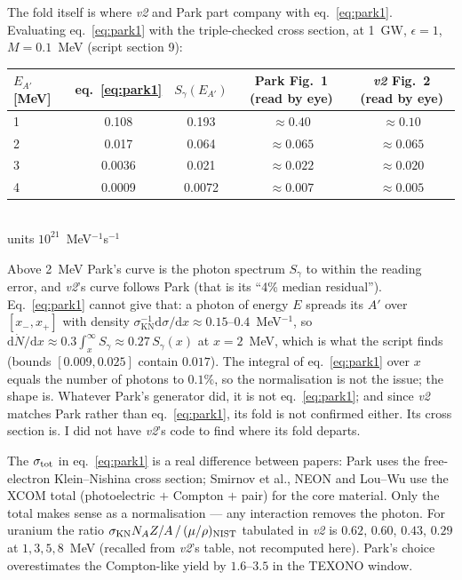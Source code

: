 \documentclass[11pt,a4paper]{article}
\newcommand{\Ap}{A'}
\newcommand{\eps}{\epsilon}
\newcommand{\KN}{\mathrm{KN}}
\newcommand{\dd}{\mathrm{d}}
\begin{document}
The fold itself is where \emph{v2} and Park part company with eq.~\eqref{eq:park1}. Evaluating eq.~\eqref{eq:park1}
with the triple-checked cross section, at 1~GW, $\eps=1$, $M=0.1$~MeV (script section 9):
\begin{center}\small
\begin{tabular}{@{}lcccc@{}}
\toprule
$E_{\Ap}$ [MeV] & eq.~\eqref{eq:park1} & $S_\gamma(E_{\Ap})$ & Park Fig.~1 (read by eye) & \emph{v2} Fig.~2 (read by eye)\\
\midrule
1 & 0.108 & 0.193 & $\approx0.40$ & $\approx0.10$\\
2 & 0.017 & 0.064 & $\approx0.065$ & $\approx0.065$\\
3 & 0.0036 & 0.021 & $\approx0.022$ & $\approx0.020$\\
4 & 0.0009 & 0.0072 & $\approx0.007$ & $\approx0.005$\\
\bottomrule
\end{tabular}\\[2pt]
units $10^{21}$~MeV$^{-1}$s$^{-1}$
\end{center}
Above 2~MeV Park's curve is the photon spectrum $S_\gamma$ to within the reading error, and \emph{v2}'s curve follows
Park (that is its ``4\% median residual''). Eq.~\eqref{eq:park1} cannot give that: a photon of energy $E$ spreads its
$\Ap$ over $[x_-,x_+]$ with density $\sigma_\KN^{-1}\dd\sigma/\dd x\approx0.15$--$0.4$~MeV$^{-1}$, so
$\dd\dot N/\dd x\approx0.3\int_x^\infty S_\gamma\approx0.27\,S_\gamma(x)$ at $x=2$~MeV, which is what the script finds
(bounds $[0.009,0.025]$ contain $0.017$). The integral of eq.~\eqref{eq:park1} over $x$ equals the number of photons
to $0.1\%$, so the normalisation is not the issue; the shape is. Whatever Park's generator did, it is not
eq.~\eqref{eq:park1}; and since \emph{v2} matches Park rather than eq.~\eqref{eq:park1}, its fold is not confirmed
either. Its cross section is. I did not have \emph{v2}'s code to find where its fold departs.

The $\sigma_{\rm tot}$ in eq.~\eqref{eq:park1} is a real difference between papers: Park uses the free-electron
Klein--Nishina cross section; Smirnov et al., NEON and Lou--Wu use the XCOM total (photoelectric $+$ Compton $+$
pair) for the core material. Only the total makes sense as a normalisation --- any interaction removes the photon.
For uranium the ratio $\sigma_\KN N_A Z/A\,/\,(\mu/\rho)_{\rm NIST}$ tabulated in \emph{v2} is $0.62$, $0.60$, $0.43$,
$0.29$ at $1,3,5,8$~MeV (recalled from \emph{v2}'s table, not recomputed here). Park's choice overestimates the
Compton-like yield by $1.6$--$3.5$ in the TEXONO window.
\end{document}

